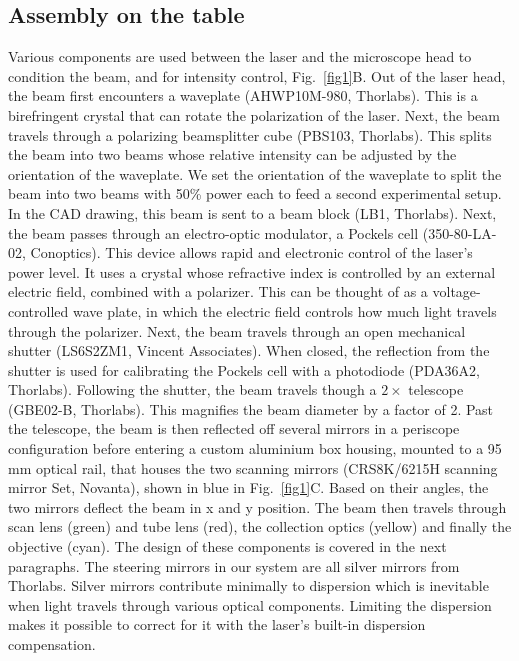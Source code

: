 \documentclass[10pt,letterpaper]{article}
\begin{document}
\subsection*{Assembly on the table}
Various components are used between the laser and the microscope head to condition the beam, and  for intensity control, Fig.~\ref{fig1}B. Out of the laser head, the beam first encounters a waveplate (AHWP10M-980, Thorlabs). This is a birefringent crystal that can rotate the polarization of the laser. Next, the beam travels through a polarizing beamsplitter cube (PBS103, Thorlabs). This splits the beam into two beams whose relative intensity can be adjusted by the orientation of the waveplate. We set the orientation of the waveplate to split the beam into two beams with 50\% power each to feed a second experimental setup. In the CAD drawing, this beam is sent to a beam block (LB1, Thorlabs). Next, the beam passes through an electro-optic modulator, a Pockels cell (350-80-LA-02, Conoptics). This device allows rapid and electronic control of the laser's power level. It uses a crystal whose refractive index is controlled by an external electric field, combined with a polarizer. This can be thought of as a voltage-controlled wave plate, in which the electric field controls how much light travels through the polarizer. Next, the beam travels through an open mechanical shutter (LS6S2ZM1, Vincent Associates). When closed, the reflection from the shutter is used for calibrating the Pockels cell with a photodiode (PDA36A2, Thorlabs). Following the shutter, the beam travels though a $2\times$ telescope (GBE02-B, Thorlabs). This magnifies the beam diameter by a factor of 2. Past the telescope, the beam is then reflected off several mirrors in a periscope configuration before entering a custom aluminium box housing, mounted to a 95 mm optical rail, that houses the two scanning mirrors (CRS8K/6215H scanning mirror Set, Novanta), shown in blue in  Fig.~\ref{fig1}C. Based on their angles, the two mirrors deflect the beam in x and y position. The beam then travels through scan lens (green) and tube lens (red), the collection optics (yellow) and finally the objective (cyan). The design of these components is covered in the next paragraphs. The steering mirrors in our system are all silver mirrors from Thorlabs. Silver mirrors contribute minimally to dispersion which is inevitable when light travels through various optical components. Limiting the dispersion makes it possible to correct for it with the laser's built-in dispersion compensation. 
\end{document}
